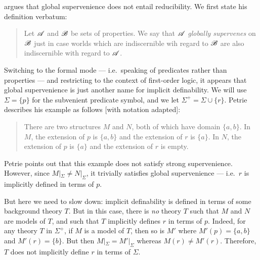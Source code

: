 \begin{example} \cite{petrie} argues that global supervenience does
  not entail reducibility.  We first state his definition verbatum:
  \begin{quote} Let $\mathscr A$ and $\mathscr B$ be sets of properties.  We say
    that $\mathscr A$ \emph{globally supervenes} on $\mathscr B$ just in case worlds
    which are indiscernible wih regard to $\mathscr B$ are also indiscernible
    with regard to $\mathscr A$.  \end{quote} Switching to the formal mode
  --- i.e.\ speaking of predicates rather than properties --- and
  restricting to the context of first-order logic, it appears that
  global supervenience is just another name for implicit definability.
  We will use $\Sigma = \{ p\}$ for the subvenient predicate symbol,
  and we let $\Sigma ^+=\Sigma \cup \{ r\}$.  Petrie describes his
  example as follows [with notation adapted]:
  \begin{quote}
    There are two structures $M$ and $N$, both of which have domain
    $\{ a,b\}$.  In $M$, the extension of $p$ is $\{ a,b\}$ and the
    extension of $r$ is $\{ a\}$.  In $N$, the extension of $p$ is
    $\{ a\}$ and the extension of $r$ is empty.  \end{quote} Petrie
  points out that this example does not satisfy strong supervenience.
  However, since $M|_\Sigma\neq N|_\Sigma$, it trivially satisfies
  global supervenience --- i.e.\ $r$ is implicitly defined in terms of
  $p$.

  But here we need to slow down: implicit definability is defined in
  terms of some background theory $T$.  But in this case, there is
  {\it no} theory $T$ such that $M$ and $N$ are models of $T$, and
  such that $T$ implicitly defines $r$ in terms of $p$.  Indeed, for
  any theory $T$ in $\Sigma ^+$, if $M$ is a model of $T$, then so is
  $M'$ where $M'(p)=\{ a,b\}$ and $M'(r)=\{ b\}$.  But then
  $M|_\Sigma =M'|_\Sigma$ whereas $M(r)\neq M'(r)$.  Therefore, $T$
  does not implicitly define $r$ in terms of $\Sigma$.


\end{example}
